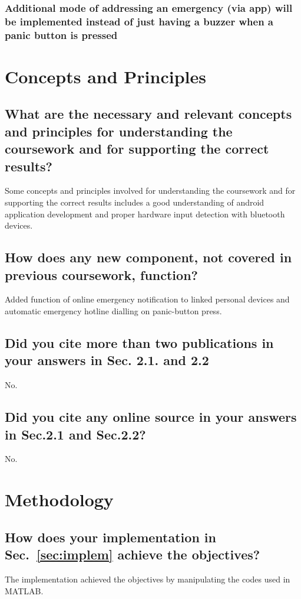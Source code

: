 \subsubsection{Additional mode of addressing an emergency (via app) will be implemented instead of just having a buzzer when a panic button is pressed} 
	


\section{Concepts and Principles}
\label{sec:concps}

\subsection{What are the necessary and relevant concepts and principles for understanding the coursework and for supporting the correct results?}
Some concepts and principles involved for understanding the coursework and for supporting the correct results includes a good understanding of android application development and proper hardware input detection with bluetooth devices.

\subsection{How does any new component, not covered in  previous coursework, function?}
Added function of online emergency notification to linked personal devices and automatic emergency hotline dialling on panic-button press.

\subsection{Did you cite more than two publications in your answers in Sec. 2.1. and 2.2}
No.
	
\subsection{Did you cite any online source in your answers in Sec.2.1 and Sec.2.2?}
No.


\section{Methodology}

\subsection{How does your implementation in Sec.~\ref{sec:implem} achieve the objectives?}
The implementation achieved the objectives by manipulating the codes used in MATLAB.
	
